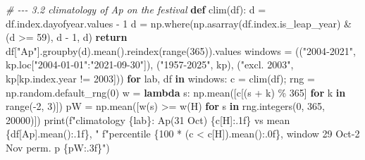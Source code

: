 \documentclass[
  10pt,
  a4paper,
]{article}
\newenvironment{Shaded}{}{}
\newcommand{\BuiltInTok}[1]{#1}
\newcommand{\CommentTok}[1]{\textit{#1}}
\newcommand{\ControlFlowTok}[1]{\textbf{#1}}
\newcommand{\DecValTok}[1]{#1}
\newcommand{\KeywordTok}[1]{\textbf{#1}}
\newcommand{\NormalTok}[1]{#1}
\newcommand{\OperatorTok}[1]{#1}
\newcommand{\SpecialCharTok}[1]{#1}
\newcommand{\SpecialStringTok}[1]{#1}
\newcommand{\StringTok}[1]{#1}
\begin{document}
\begin{Shaded}
\begin{Highlighting}[]
\CommentTok{\# {-}{-}{-} 3.2  climatology of Ap on the festival}
\KeywordTok{def}\NormalTok{ clim(df):}
\NormalTok{    d }\OperatorTok{=}\NormalTok{ df.index.dayofyear.values }\OperatorTok{{-}} \DecValTok{1}
\NormalTok{    d }\OperatorTok{=}\NormalTok{ np.where(np.asarray(df.index.is\_leap\_year) }\OperatorTok{\&}\NormalTok{ (d }\OperatorTok{\textgreater{}=} \DecValTok{59}\NormalTok{), d }\OperatorTok{{-}} \DecValTok{1}\NormalTok{, d)}
    \ControlFlowTok{return}\NormalTok{ df[}\StringTok{"Ap"}\NormalTok{].groupby(d).mean().reindex(}\BuiltInTok{range}\NormalTok{(}\DecValTok{365}\NormalTok{)).values}
\NormalTok{windows }\OperatorTok{=}\NormalTok{ ((}\StringTok{"2004{-}2021"}\NormalTok{, kp.loc[}\StringTok{"2004{-}01{-}01"}\NormalTok{:}\StringTok{"2021{-}09{-}30"}\NormalTok{]), (}\StringTok{"1957{-}2025"}\NormalTok{, kp),}
\NormalTok{           (}\StringTok{"excl. 2003"}\NormalTok{, kp[kp.index.year }\OperatorTok{!=} \DecValTok{2003}\NormalTok{]))}
\ControlFlowTok{for}\NormalTok{ lab, df }\KeywordTok{in}\NormalTok{ windows:}
\NormalTok{    c }\OperatorTok{=}\NormalTok{ clim(df)}\OperatorTok{;}\NormalTok{ rng }\OperatorTok{=}\NormalTok{ np.random.default\_rng(}\DecValTok{0}\NormalTok{)}
\NormalTok{    w }\OperatorTok{=} \KeywordTok{lambda}\NormalTok{ s: np.mean([c[(s }\OperatorTok{+}\NormalTok{ k) }\OperatorTok{\%} \DecValTok{365}\NormalTok{] }\ControlFlowTok{for}\NormalTok{ k }\KeywordTok{in} \BuiltInTok{range}\NormalTok{(}\OperatorTok{{-}}\DecValTok{2}\NormalTok{, }\DecValTok{3}\NormalTok{)])}
\NormalTok{    pW }\OperatorTok{=}\NormalTok{ np.mean([w(s) }\OperatorTok{\textgreater{}=}\NormalTok{ w(H) }\ControlFlowTok{for}\NormalTok{ s }\KeywordTok{in}\NormalTok{ rng.integers(}\DecValTok{0}\NormalTok{, }\DecValTok{365}\NormalTok{, }\DecValTok{20000}\NormalTok{)])}
    \BuiltInTok{print}\NormalTok{(}\SpecialStringTok{f"climatology }\SpecialCharTok{\{}\NormalTok{lab}\SpecialCharTok{\}}\SpecialStringTok{: Ap(31 Oct) }\SpecialCharTok{\{}\NormalTok{c[H]}\SpecialCharTok{:.1f\}}\SpecialStringTok{ vs mean }\SpecialCharTok{\{}\NormalTok{df[}\StringTok{\textquotesingle{}Ap\textquotesingle{}}\NormalTok{]}\SpecialCharTok{.}\NormalTok{mean()}\SpecialCharTok{:.1f\}}\SpecialStringTok{, "}
          \SpecialStringTok{f"percentile }\SpecialCharTok{\{}\DecValTok{100} \OperatorTok{*}\NormalTok{ (c }\OperatorTok{\textless{}}\NormalTok{ c[H])}\SpecialCharTok{.}\NormalTok{mean()}\SpecialCharTok{:.0f\}}\SpecialStringTok{, window 29 Oct{-}2 Nov perm. p }\SpecialCharTok{\{}\NormalTok{pW}\SpecialCharTok{:.3f\}}\SpecialStringTok{"}\NormalTok{)}


\end{Highlighting}
\end{Shaded}
\end{document}
